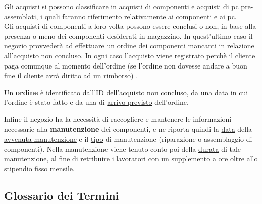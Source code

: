 Gli acquisti si possono classificare in acquisti di componenti e acquisti di pc pre-assemblati, i quali faranno riferimento relativamente ai componenti e ai pc.\\
Gli acquisti di componenti a loro volta possono essere conclusi o non, in base alla presenza o meno dei componenti desiderati in magazzino. In quest'ultimo caso il negozio provvederà ad effettuare un ordine dei componenti mancanti in relazione all'acquisto non concluso. In ogni caso l'acquisto viene registrato perchè il cliente paga comunque al momento dell'ordine (se l'ordine non dovesse andare a buon fine il cliente avrà diritto ad un rimborso) .\par
Un \textbf{ordine} è identificato dall'ID dell'acquisto non concluso, da una \underline{data} in cui l'ordine è stato fatto e da una di \underline{arrivo previsto} dell'ordine.\par
Infine il negozio ha la necessità di raccogliere e mantenere le informazioni necessarie alla 					\textbf{manutenzione} dei componenti, e ne riporta quindi la \underline{data} della \underline{avvenuta manutenzione} e il \underline{tipo} di manutenzione (riparazione o assemblaggio di componenti). Nella manutenzione viene tenuto conto poi della \underline{durata} di tale manutenzione, al fine di retribuire i lavoratori con un supplemento a ore oltre allo stipendio fisso mensile.

\subsection{Glossario dei Termini}

